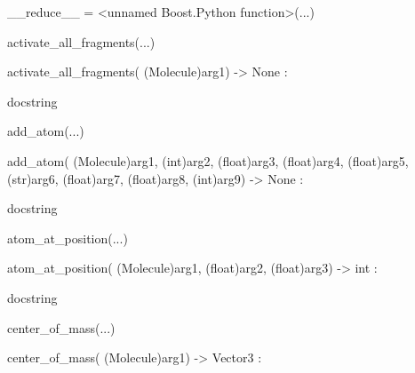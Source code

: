 \documentclass[letterpaper,10pt,english]{sphinxmanual}
\begin{document}
\begin{description}
\begin{description}
\begin{DUlineblock}{0em}
\begin{DUlineblock}{\DUlineblockindent}
\item[] 
\end{DUlineblock}
\item[] \_\_reduce\_\_ = \textless{}unnamed Boost.Python function\textgreater{}(...)
\item[] 
\item[] activate\_all\_fragments(...)
\item[]
\begin{DUlineblock}{\DUlineblockindent}
\item[] activate\_all\_fragments( (Molecule)arg1) -\textgreater{} None :
\item[]
\begin{DUlineblock}{\DUlineblockindent}
\item[] docstring
\item[] 
\end{DUlineblock}
\end{DUlineblock}
\item[] add\_atom(...)
\item[]
\begin{DUlineblock}{\DUlineblockindent}
\item[] add\_atom( (Molecule)arg1, (int)arg2, (float)arg3, (float)arg4, (float)arg5, (str)arg6, (float)arg7, (float)arg8, (int)arg9) -\textgreater{} None :
\item[]
\begin{DUlineblock}{\DUlineblockindent}
\item[] docstring
\item[] 
\end{DUlineblock}
\end{DUlineblock}
\item[] atom\_at\_position(...)
\item[]
\begin{DUlineblock}{\DUlineblockindent}
\item[] atom\_at\_position( (Molecule)arg1, (float)arg2, (float)arg3) -\textgreater{} int :
\item[]
\begin{DUlineblock}{\DUlineblockindent}
\item[] docstring
\item[] 
\end{DUlineblock}
\end{DUlineblock}
\item[] center\_of\_mass(...)
\item[]
\begin{DUlineblock}{\DUlineblockindent}
\item[] center\_of\_mass( (Molecule)arg1) -\textgreater{} Vector3 :

\end{DUlineblock}
\end{DUlineblock}
\end{description}
\end{description}
\end{document}
